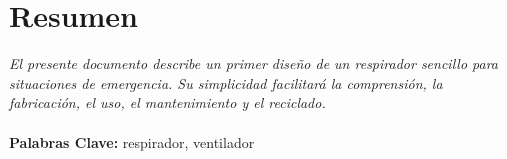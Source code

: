 \section*{Resumen}
\textit{
    El presente documento describe un primer diseño de un respirador sencillo para situaciones de emergencia. Su simplicidad facilitará la comprensión, la fabricación, el uso, el mantenimiento y el reciclado.
}\\
\\
\textbf{Palabras Clave:} respirador, ventilador